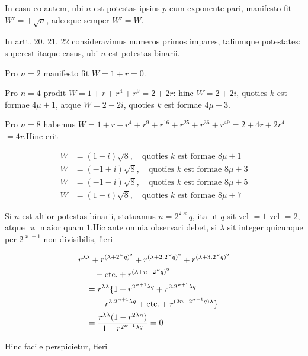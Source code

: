 In casu eo autem, ubi $n$ est potestas ipsius $p$ cum exponente pari, manifesto fit $W'=+\surd n$, adeoque semper $W'=W$.


In artt. 20. 21. 22 consideravimus numeros primos impares, taliumque potestates: superest itaque casus, ubi $n$ est potestas binarii.

Pro $n=2$ manifesto fit $W=1+r=0$.

Pro $n=4$ prodit $W=1+r+r^4+r^9=2+2r$: hinc $W=2+2i$, quoties $k$ est formae $4\mu+1$, atque $W=2-2i$, quoties $k$ est formae $4\mu+3$.

Pro $n=8$ habemus $W=1+r+r^4+r^9+r^{16}+r^{25}+r^{36}+r^{49}=2+4r+2r^4$ $=4r$.\quad Hinc erit

\[
\begin{aligned}
W&=(1+i)\surd8,\quad\text{quoties }k\text{ est formae }8\mu+1\\
W&=(-1+i)\surd8,\quad\text{quoties }k\text{ est formae }8\mu+3\\
W&=(-1-i)\surd8,\quad\text{quoties }k\text{ est formae }8\mu+5\\
W&=(1-i)\surd8,\quad\text{quoties }k\text{ est formae }8\mu+7
\end{aligned}
\]

Si $n$ est altior potestas binarii, statuamus $n=2^{2\varkappa}q$, ita ut $q$ sit vel $=1$ vel $=2$, atque $\varkappa$ maior quam $1$.\quad Hic ante omnia observari debet, si $\lambda$ sit integer quicunque per $2^{\varkappa-1}$ non divisibilis, fieri

\[
\begin{aligned}
&r^{\lambda\lambda}+r^{(\lambda+2^\varkappa q)^2}+r^{(\lambda+2\mathbin{.}2^\varkappa q)^2}+r^{(\lambda+3\mathbin{.}2^\varkappa q)^2}\\&\qquad+\text{etc.}+r^{(\lambda+n-2^\varkappa q)^2}\\
&\quad=r^{\lambda\lambda}\{1+r^{2^{\varkappa+1}\lambda q}+r^{2\mathbin{.}2^{\varkappa+1}\lambda q}\\&\qquad+r^{3\mathbin{.}2^{\varkappa+1}\lambda q}+\text{etc.}+r^{(2n-2^{\varkappa+1}q)\lambda}\}\\&\quad=\frac{r^{\lambda\lambda}(1-r^{2\lambda n})}{1-r^{2^{\varkappa+1}\lambda q}}=0
\end{aligned}
\]

Hinc facile perspicietur, fieri

